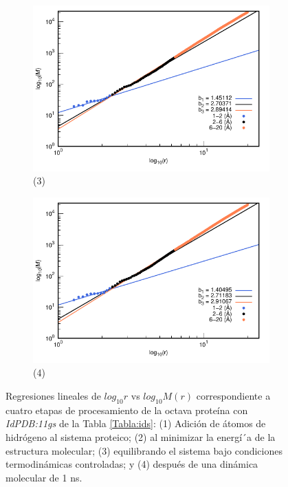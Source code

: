 \begin{figure}[H]
			\vspace{0cm} %
			
			\hspace{-0.3cm} 
			\begin{subfigure}{0.49\textwidth}
				\centering
				\includegraphics[width=\linewidth,page=1]{graphs/PDBs/11gs/11gsEq.pdf}
				\caption{(3)}
			\end{subfigure}
			\hspace{0.2cm}
			\begin{subfigure}{0.49\textwidth} %
				\centering
				\includegraphics[width=\linewidth,page=1]{graphs/PDBs/11gs/11gs1ns.pdf}
				\caption{(4)}
			\end{subfigure}
			
			\caption{Regresiones lineales de $log_{10}r$ vs $log_{10}M(r)$ correspondiente a cuatro etapas de procesamiento de la octava prote\'{i}na con \textit{IdPDB:11gs} de la Tabla \ref{Tabla:ids}: (1) Adici\'{o}n de \'{a}tomos de hidr\'{o}geno al sistema proteico; (2) al minimizar la energ\'{i´}a de la estructura molecular; (3) equilibrando el sistema bajo condiciones termodin\'{a}micas controladas; y (4) despu\'{e}s de una din\'{a}mica molecular de 1 ns.}
			\label{fig:11gs}
		\end{figure}
		




